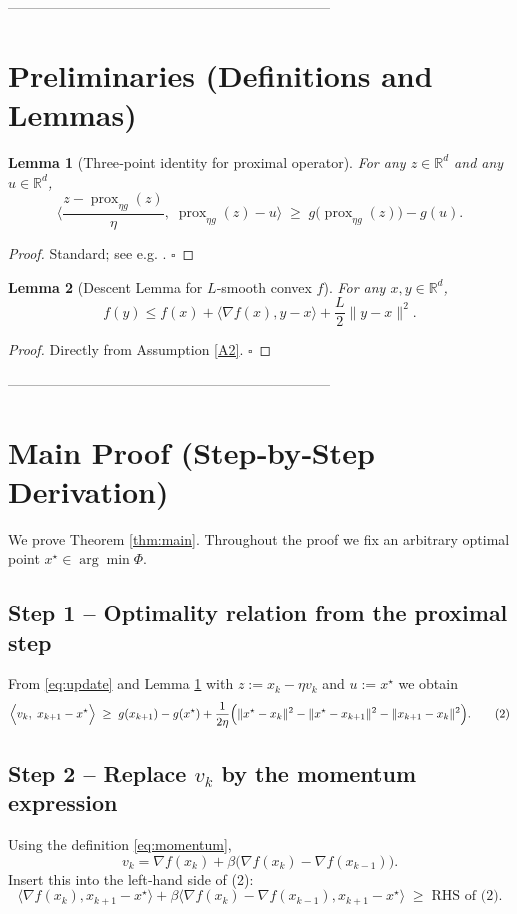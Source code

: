 \documentclass{article}
\newtheorem{lemma}{Lemma}
\newcommand{\prox}{\operatorname{prox}}
\newcommand{\R}{\mathbb{R}}
\begin{document}
---------------------------------------------------------------------

\section*{Preliminaries (Definitions and Lemmas)}
\begin{lemma}[Three‑point identity for proximal operator]\label{lem:prox}
For any $z\in\R^{d}$ and any $u\in\R^{d}$,
\[
\bigl\langle \frac{z-\prox_{\eta g}(z)}{\eta},\; \prox_{\eta g}(z)-u \bigr\rangle
\;\ge\;
g\!\bigl(\prox_{\eta g}(z)\bigr)-g(u).
\]
\end{lemma}
\begin{proof}
Standard; see e.g. \cite{parikh2014proximal}. \hfill $\square$
\end{proof}

\begin{lemma}[Descent Lemma for $L$‑smooth convex $f$]\label{lem:descent}
For any $x,y\in\R^{d}$,
\[
f(y)\le f(x)+\langle\nabla f(x),y-x\rangle+\frac{L}{2}\|y-x\|^{2}. 
\]
\end{lemma}
\begin{proof}
Directly from Assumption \ref{A2}. \hfill $\square$
\end{proof}

---------------------------------------------------------------------

\section*{Main Proof (Step‑by‑Step Derivation)}
We prove Theorem \ref{thm:main}. Throughout the proof we fix an arbitrary optimal point $x^{\star}\in\arg\min\Phi$.

\subsection*{Step 1 – Optimality relation from the proximal step}
From \eqref{eq:update} and Lemma \ref{lem:prox} with $z:=x_k-\eta v_k$ and $u:=x^{\star}$ we obtain
\[
\Bigl\langle v_k,\; x_{k+1}-x^{\star}\Bigr\rangle
\;\ge\;
g(x_{k+1})-g(x^{\star})+\frac{1}{2\eta}\Bigl(\|x^{\star}-x_k\|^{2}
-\|x^{\star}-x_{k+1}\|^{2}
-\|x_{k+1}-x_k\|^{2}\Bigr). \tag{2}
\]

\subsection*{Step 2 – Replace $v_k$ by the momentum expression}
Using the definition \eqref{eq:momentum},
\[
v_k = \nabla f(x_k)+\beta\bigl(\nabla f(x_k)-\nabla f(x_{k-1})\bigr).
\]
Insert this into the left‑hand side of (2):
\[
\langle\nabla f(x_k),x_{k+1}-x^{\star}\rangle
+\beta\langle\nabla f(x_k)-\nabla f(x_{k-1}),x_{k+1}-x^{\star}\rangle
\;\ge\;
\text{RHS of (2)}. \tag{3}
\]
\end{document}
